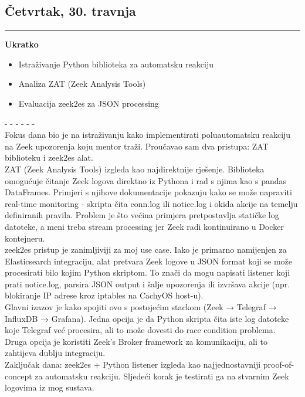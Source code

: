 \documentclass[12pt, a4paper]{article}
\newcommand{\dan}[1]{
    \subsection*{#1}
    \vspace{-0.5em} 
    \hrule \vspace{0.5em} 
}
\begin{document}
\dan{Četvrtak, 30. travnja}
\textbf{Ukratko}
\begin{itemize}
    \item Istraživanje Python biblioteka za automatsku reakciju
    \item Analiza ZAT (Zeek Analysis Tools)
    \item Evaluacija zeek2es za JSON processing
\end{itemize}
- - - - - - \\
Fokus dana bio je na istraživanju kako implementirati poluautomatsku reakciju na Zeek upozorenja koju mentor traži. Proučavao sam dva pristupa: ZAT biblioteku i zeek2es alat.
\\
ZAT (Zeek Analysis Tools) izgleda kao najdirektnije rješenje. Biblioteka omogućuje čitanje Zeek logova direktno iz Pythona i rad s njima kao s pandas DataFrames. Primjeri s njihove dokumentacije pokazuju kako se može napraviti real-time monitoring - skripta čita conn.log ili notice.log i okida akcije na temelju definiranih pravila. Problem je što većina primjera pretpostavlja statičke log datoteke, a meni treba stream processing jer Zeek radi kontinuirano u Docker kontejneru.
\\
zeek2es pristup je zanimljiviji za moj use case. Iako je primarno namijenjen za Elasticsearch integraciju, alat pretvara Zeek logove u JSON format koji se može procesirati bilo kojim Python skriptom. To znači da mogu napisati listener koji prati notice.log, parsira JSON output i šalje upozorenja ili izvršava akcije (npr. blokiranje IP adrese kroz iptables na CachyOS host-u).
\\
Glavni izazov je kako spojiti ovo s postojećim stackom (Zeek → Telegraf → InfluxDB → Grafana). Jedna opcija je da Python skripta čita iste log datoteke koje Telegraf već procesira, ali to može dovesti do race condition problema. Druga opcija je koristiti Zeek's Broker framework za komunikaciju, ali to zahtijeva dublju integraciju.
\\
Zaključak dana: zeek2es + Python listener izgleda kao najjednostavniji proof-of-concept za automatsku reakciju. Sljedeći korak je testirati ga na stvarnim Zeek logovima iz mog sustava.
\end{document}
